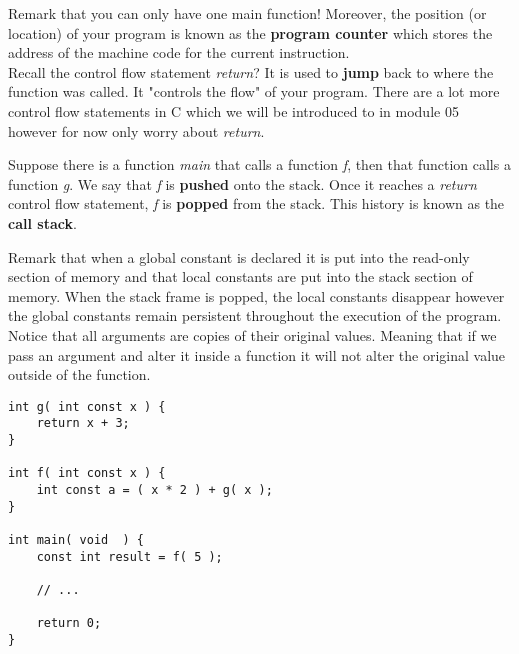 Remark that you can only have one main function! Moreover, the position (or location) of your program is known as the \textbf{program counter} which stores the address of the machine code for the current instruction.\\

Recall the control flow statement \emph{return}? It is used to \textbf{jump} back to where the function was called. It "controls the flow" of your program. There are a lot more control flow statements in C which we will be introduced to in module 05 however for now only worry about \emph{return}.\\


Suppose there is a function \textit{main} that calls a function \textit{f}, then that function calls a function \textit{g}. We say that \textit{f} is \textbf{pushed} onto the stack. Once it reaches a \textit{return} control flow statement, \textit{f} is \textbf{popped} from the stack. This history is known as the \textbf{call stack}.\\


Remark that when a global constant is declared it is put into the read-only section of memory and that local constants are put into the stack section of memory. When the stack frame is popped, the local constants disappear however the global constants remain persistent throughout the execution of the program.\\

Notice that all arguments are copies of their original values. Meaning that if we pass an argument and alter it inside a function it will not alter the original value outside of the function.\\


\lstset {
	language=c
}
\begin{lstlisting}
int g( int const x ) {
	return x + 3;
}

int f( int const x ) {
	int const a = ( x * 2 ) + g( x );
}

int main( void  ) {
	const int result = f( 5 );
	
	// ...
	
	return 0;
}
\end{lstlisting}

